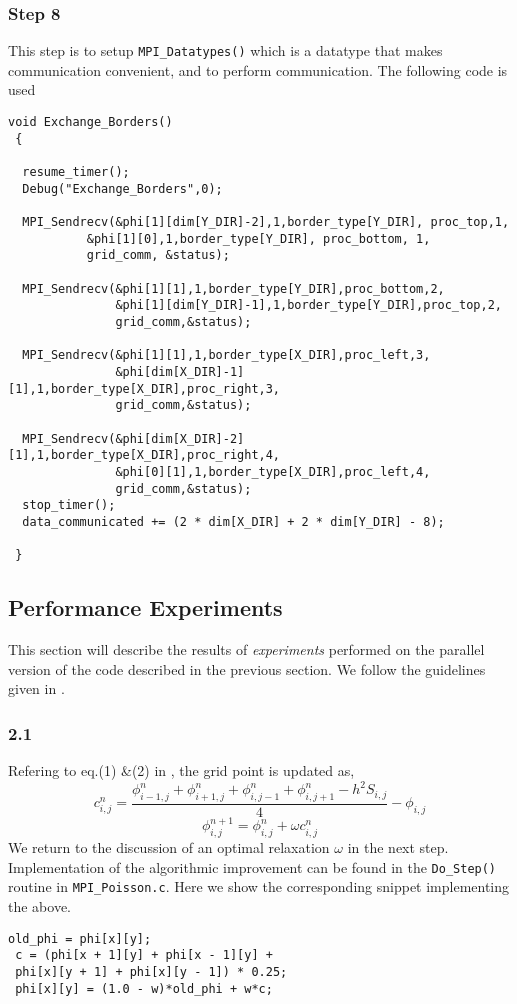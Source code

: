 \subsubsection*{Step 8}
This step is to setup \texttt{MPI\_Datatypes()} which is a datatype that makes communication convenient, and to perform communication. The following code is used
\begin{lstlisting}[style=CStyle]
 void Exchange_Borders()
 {

  resume_timer();
  Debug("Exchange_Borders",0);
  
  MPI_Sendrecv(&phi[1][dim[Y_DIR]-2],1,border_type[Y_DIR], proc_top,1,
	       &phi[1][0],1,border_type[Y_DIR], proc_bottom, 1,
	       grid_comm, &status);
  
  MPI_Sendrecv(&phi[1][1],1,border_type[Y_DIR],proc_bottom,2,
               &phi[1][dim[Y_DIR]-1],1,border_type[Y_DIR],proc_top,2,
               grid_comm,&status);
  
  MPI_Sendrecv(&phi[1][1],1,border_type[X_DIR],proc_left,3,
               &phi[dim[X_DIR]-1][1],1,border_type[X_DIR],proc_right,3,
               grid_comm,&status);

  MPI_Sendrecv(&phi[dim[X_DIR]-2][1],1,border_type[X_DIR],proc_right,4,
               &phi[0][1],1,border_type[X_DIR],proc_left,4,
               grid_comm,&status);
  stop_timer();
  data_communicated += (2 * dim[X_DIR] + 2 * dim[Y_DIR] - 8);
  
 }
\end{lstlisting}
\newpage
\subsection{Performance Experiments}
This section will describe the results of \emph{experiments} performed on the parallel version of the code described in the previous section. We follow the guidelines given in \cite{labex2}.
\subsubsection*{2.1}
Refering to eq.(1) \&(2) in \cite{labex2}, the grid point is updated as,
\begin{equation}
  c_{i,j}^{n} = \frac{\phi_{i-1,j}^{n}+\phi_{i+1,j}^{n}+\phi_{i,j-1}^{n}+\phi_{i,j+1}^{n} - h^{2}S_{i,j}}{4}-\phi_{i,j}
\end{equation}
\begin{equation}
  \phi_{i,j}^{n+1} = \phi_{i,j}^{n} + \omega c_{i,j}^{n}
\end{equation}
We return to the discussion of an optimal relaxation $\omega$ in the next step. 
Implementation of the algorithmic improvement can be found in the \texttt{Do\_Step()} routine in \texttt{MPI\_Poisson.c}. Here we show the corresponding snippet implementing the above.
\begin{lstlisting}[style=CStyle]
 old_phi = phi[x][y];
 c = (phi[x + 1][y] + phi[x - 1][y] +
 phi[x][y + 1] + phi[x][y - 1]) * 0.25;
 phi[x][y] = (1.0 - w)*old_phi + w*c;
\end{lstlisting}

